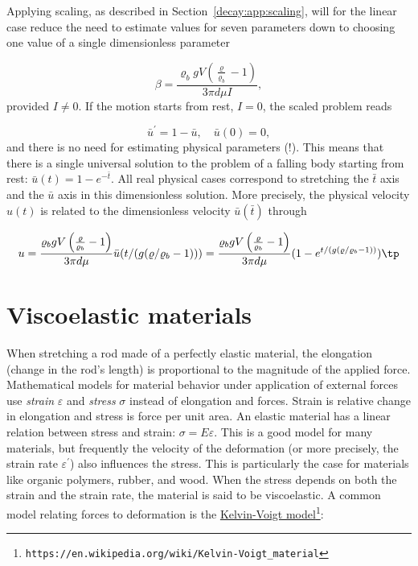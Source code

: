 \documentclass[graybox,sectrefs,envcountresetchap,open=right,final]{svmonodo}
\begin{document}
Applying scaling, as described in Section~\ref{decay:app:scaling},
will for the linear case reduce the need to estimate values for
seven parameters down to choosing one value of a single dimensionless parameter

\[ \beta = \frac{\varrho_b gV\left(\frac{\varrho}{\varrho_b} -1\right)}{3\pi d\mu I},\]
provided $I\neq 0$. If the motion starts from rest, $I=0$, the scaled
problem reads

\[ \bar u^{\prime}=1-\bar u, \quad \bar u(0)=0,\]
and there is
no need for estimating physical parameters (!).
This means that there is a single universal solution to the problem
of a falling body starting from rest:
$\bar u(t) = 1 - e^{-\bar t}$. All real
physical cases correspond to stretching the $\bar t$ axis and the $\bar u$
axis in this dimensionless solution. More precisely, the physical velocity
$u(t)$ is related to the dimensionless velocity $\bar u(\bar t)$ through

\[ u = \frac{\varrho_bgV\left(\frac{\varrho}{\varrho_b} -1\right)}{3\pi d\mu}\bar u(t/(g(\varrho/\varrho_b -1))) =
\frac{\varrho_bgV\left(\frac{\varrho}{\varrho_b} -1\right)}{3\pi d\mu}(1 -
e^{t/(g(\varrho/\varrho_b -1))})\tp\]

\section{Viscoelastic materials}
\label{decay:app:viscoelasticity}


When stretching a rod made of a perfectly elastic material, the
elongation (change in the rod's
length) is proportional to the magnitude of the applied force.
Mathematical models for material behavior under application of
external forces use \emph{strain} $\varepsilon$
and \emph{stress} $\sigma$ instead of elongation and
forces. Strain is relative change in elongation and stress is force
per unit area. An elastic material has a linear relation between
stress and strain:  $\sigma = E\varepsilon$. This is a good model
for many materials, but frequently the velocity of the deformation
(or more precisely, the strain rate $\varepsilon^{\prime}$)
also influences the stress. This is particularly the case for
materials like organic polymers, rubber, and wood. When the stress
depends on both the strain and the strain rate, the material is
said to be viscoelastic. A common model relating forces to deformation
is the \href{{https://en.wikipedia.org/wiki/Kelvin-Voigt_material}}{Kelvin-Voigt model}\footnote{\texttt{https://en.wikipedia.org/wiki/Kelvin-Voigt\_material}}:
\end{document}
